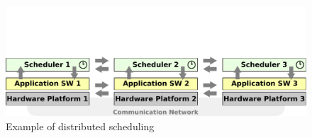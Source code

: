 \begin{figure}[H]
\centering
\includegraphics[scale=0.4]{../images/coord.pdf}
\caption{Example of distributed scheduling}\label{fig:coord}
\end{figure}

